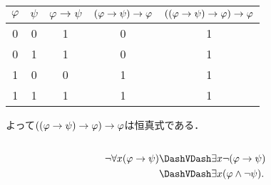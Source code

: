 \begin{table}[htbp]
	\centering
	\begin{tabular}{cc|ccc}
		\hline
		\(\varphi\) & \(\psi\) & \(\varphi \to \psi\) & \(\paren{\varphi \to \psi} \to \varphi\) & \(\paren{\paren{\varphi \to \psi} \to \varphi} \to \varphi\) \\ \hline
		0           & 0        & 1                    & 0                                        & 1                                                            \\
		0           & 1        & 1                    & 0                                        & 1                                                            \\
		1           & 0        & 0                    & 1                                        & 1                                                            \\
		1           & 1        & 1                    & 1                                        & 1                                                            \\
		\hline
	\end{tabular}
\end{table}

よって\(\paren{\paren{\varphi \to \psi} \to \varphi} \to \varphi\)は恒真式である．

\subsection*{}

\begin{align*}
	\lnot \forall x \paren{\varphi \to \psi} & \logicallyequivalent \exists x \lnot \paren{\varphi \to \psi}    \\
	                                         & \logicallyequivalent \exists x \paren{\varphi \land \lnot \psi}.
\end{align*}

\section*{}

\subsection*{}

